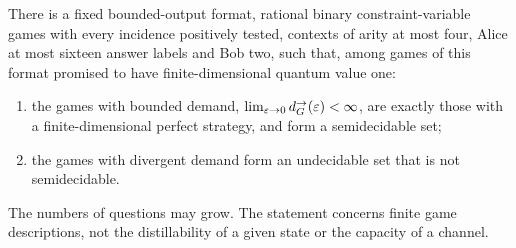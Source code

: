 \begin{theorem}\label{thm:undecidable}
There is a fixed bounded-output format, rational binary constraint-variable games with every incidence positively tested,
contexts of arity at most four, Alice at most sixteen answer labels and Bob two, such that, among games of this format
promised to have finite-dimensional quantum value one:
\begin{enumerate}[label=(\alph*),itemsep=1pt]
\item the games with bounded demand, $\lim_{\varepsilon\to0}d_G^\to(\varepsilon)<\infty$, are exactly those with a finite-dimensional
perfect strategy, and form a semidecidable set;
\item the games with divergent demand form an undecidable set that is not semidecidable.
\end{enumerate}
The numbers of questions may grow. The statement concerns finite game descriptions, not the distillability of a given
state or the capacity of a channel.
\end{theorem}

